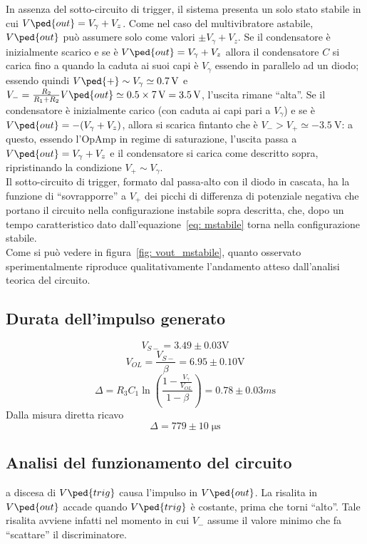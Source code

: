 \documentclass[10pt,a4paper]{article}
\begin{document}
In assenza del sotto-circuito di trigger, il sistema presenta un solo stato stabile in cui $ V\ped{out} =  V_{\gamma} + V_{z} $.
Come nel caso del multivibratore astabile, $ V\ped{out} $ può assumere solo come valori $ \pm V_{\gamma} + V_{z} $.
Se il condensatore è inizialmente scarico e se è $ V\ped{out} = V_{\gamma} + V_{z} $ allora il condensatore $ C $ si carica fino a quando la caduta ai suoi capi è $ V_{\gamma} $ essendo in parallelo ad un diodo; essendo quindi $ V\ped{+} \sim V_{\gamma} \simeq \SI{0.7}{\volt} $ e $ V_{-} = \frac{R_{2}}{R_{1} + R_{2}} V\ped{out} \simeq 0.5 \times \SI{7}{\volt} = \SI{3.5}{\volt} $, l'uscita rimane ``alta''.
Se il condensatore è inizialmente carico (con caduta ai capi pari a $ V_{\gamma} $) e se è $ V\ped{out} = -(V_{\gamma} + V_{z}) $, allora si scarica fintanto che è $ V_{-} > V_{+} \simeq -\SI{3.5}{\volt} $: a questo, essendo l'OpAmp in regime di saturazione, l'uscita passa a $ V\ped{out} = V_{\gamma} + V_{z} $ e il condensatore si carica come descritto sopra, ripristinando la condizione $ V_{+} \sim V_{\gamma} $. \\

Il sotto-circuito di trigger, formato dal passa-alto con il diodo in cascata, ha la funzione di ``sovrapporre'' a $ V_{+} $ dei picchi di differenza di potenziale negativa che portano il circuito nella configurazione instabile sopra descritta, che, dopo un tempo caratteristico dato dall'equazione~\eqref{eq: mstabile} torna nella configurazione stabile. \\

Come si può vedere in figura~\ref{fig: vout_mstabile}, quanto osservato 
sperimentalmente riproduce qualitativamente l'andamento atteso dall'analisi
teorica del circuito.

\subsection{Durata dell'impulso generato}
\[
V_{S-}= 3.49 \pm 0.03 \si{\V}
\]
\[
V_{OL} = \frac{V_{S-}}{\beta} = 6.95 \pm 0.10 \si{\V}
\]
\[
\Delta= R_3 C_1 \ln(\frac{1 - \frac{V_\gamma}{V_{OL}}}{1 - \beta})= 0.78 \pm 0.03 \si{m\s}
\]
Dalla misura diretta ricavo
\[
\Delta= 779 \pm 10 \;\si{\micro\s}
\]

\subsection{Analisi del funzionamento del circuito}
a discesa di $ V\ped{trig} $ causa l'impulso in $ V\ped{out} $. La risalita in $ V\ped{out} $ accade quando $ V\ped{trig} $ è costante, prima che torni ``alto''. Tale risalita avviene infatti nel momento in cui $ V_{-} $ assume il valore minimo che fa ``scattare'' il discriminatore.
\end{document}

